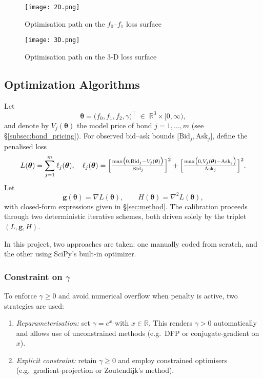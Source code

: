 \documentclass[12pt]{article}
\begin{document}
\begin{figure}[ht]
  \centering
  \begin{minipage}[t]{0.48\linewidth}
    \centering
    \texttt{[image: 2D.png]}
    \caption{Optimisation path on the $f_0$–$f_1$ loss surface}
    \label{fig:path-2d}
  \end{minipage}
  \hspace{0.02\linewidth}
  \begin{minipage}[t]{0.48\linewidth}
    \centering
    \texttt{[image: 3D.png]}
    \caption{Optimisation path on the 3-D loss surface}
    \label{fig:path-3d}
  \end{minipage}
\end{figure}

\subsection{Optimization Algorithms}

Let
\[
\boldsymbol{\theta}
=\bigl(f_{0},f_{1},f_{2},\gamma\bigr)^{\top}
\;\in\;\mathbb{R}^{3}\times[0,\infty),
\]
and denote by \(V_{j}(\boldsymbol{\theta})\) the model price of bond \(j=1,\dots,m\) (see \S\ref{subsec:bond_pricing}).  For observed bid–ask bounds \(\bigl[\mathrm{Bid}_j,\mathrm{Ask}_j\bigr]\), define the penalised loss
\[
L(\boldsymbol{\theta})
=\sum_{j=1}^{m}\ell_{j}(\boldsymbol{\theta}),
\quad
\ell_{j}(\boldsymbol{\theta})
=\Bigl[\tfrac{\max\bigl(0,\mathrm{Bid}_{j}-V_{j}(\boldsymbol{\theta})\bigr)}{\mathrm{Bid}_{j}}\Bigr]^{2}
+
\Bigl[\tfrac{\max\bigl(0,V_{j}(\boldsymbol{\theta})-\mathrm{Ask}_{j}\bigr)}{\mathrm{Ask}_{j}}\Bigr]^{2}.
\]
Let
\[
\boldsymbol{g}(\boldsymbol{\theta})
=\nabla L(\boldsymbol{\theta}),
\qquad
H(\boldsymbol{\theta})
=\nabla^{2} L(\boldsymbol{\theta}),
\]
with closed-form expressions given in \S\ref{sec:method}. The calibration proceeds through two deterministic iterative schemes,
both driven solely by the triplet \((L,\boldsymbol{g},H)\).

In this project, two approaches are taken: one manually coded from scratch, and the other using SciPy’s built-in optimizer. 

\subsubsection{Constraint on \(\gamma\)}

To enforce \(\gamma\ge0\) and avoid numerical overflow when penalty is active, two strategies are used:
\begin{enumerate}
  \item \emph{Reparameterisation:} set \(\gamma = e^{x}\) with \(x\in\mathbb{R}\).  This renders \(\gamma>0\) automatically and allows use of unconstrained methods (e.g.\ DFP or conjugate-gradient on \(x\)).
  \item \emph{Explicit constraint:} retain \(\gamma\ge0\) and employ constrained optimisers (e.g.\ gradient-projection or Zoutendijk’s method).
\end{enumerate}
\end{document}
